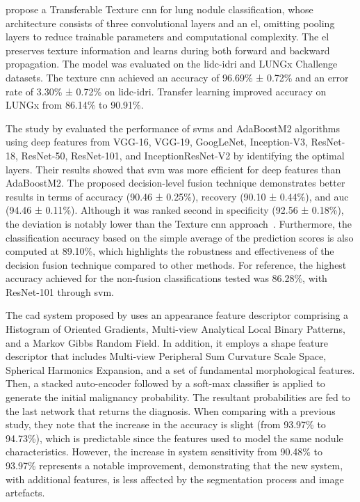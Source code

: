 \textcite{ali_efficient_2020} propose a Transferable Texture \ac{cnn} for lung nodule classification, whose architecture consists of three convolutional layers and an \ac{el}, omitting pooling layers to reduce trainable parameters and computational complexity. The \ac{el} preserves texture information and learns during both forward and backward propagation. The model was evaluated on the \ac{lidc-idri} and LUNGx Challenge datasets. The texture \ac{cnn} achieved an accuracy of 96.69\% ± 0.72\% and an error rate of 3.30\% ± 0.72\% on \ac{lidc-idri}. Transfer learning improved accuracy on LUNGx from 86.14\% to 90.91\%.  

The study by \textcite{ali_deep_2021} evaluated the performance of \acp{svm} and AdaBoostM2 algorithms using deep features from VGG-16, VGG-19, GoogLeNet, Inception-V3, ResNet-18, ResNet-50, ResNet-101, and InceptionResNet-V2 by identifying the optimal layers. Their results showed that \ac{svm} was more efficient for deep features than AdaBoostM2. The proposed decision-level fusion technique demonstrates better results in terms of accuracy (90.46 ± 0.25\%), recovery (90.10 ± 0.44\%), and \ac{auc} (94.46 ± 0.11\%). Although it was ranked second in specificity (92.56 ± 0.18\%), the deviation is notably lower than the Texture \ac{cnn} approach~\cite{ali_efficient_2020}. Furthermore, the classification accuracy based on the simple average of the prediction scores is also computed at 89.10\%, which highlights the robustness and effectiveness of the decision fusion technique compared to other methods. For reference, the highest accuracy achieved for the non-fusion classifications tested was 86.28\%, with ResNet-101 through \ac{svm}.

The \ac{cad} system proposed by \textcite{shaffie_computer-assisted_2022} uses an appearance feature descriptor comprising a Histogram of Oriented Gradients, Multi-view Analytical Local Binary Patterns, and a Markov Gibbs Random Field. In addition, it employs a shape feature descriptor that includes Multi-view Peripheral Sum Curvature Scale Space, Spherical Harmonics Expansion, and a set of fundamental morphological features. Then, a stacked auto-encoder followed by a soft-max classifier is applied to generate the initial malignancy probability. The resultant probabilities are fed to the last network that returns the diagnosis. When comparing with a previous study, they note that the increase in the accuracy is slight (from 93.97\% to 94.73\%), which is predictable since the features used to model the same nodule characteristics. However, the increase in system sensitivity from 90.48\% to 93.97\% represents a notable improvement, demonstrating that the new system, with additional features, is less affected by the segmentation process and image artefacts.

